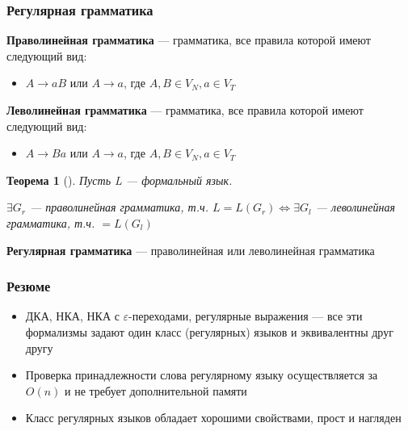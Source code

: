\documentclass{beamer}
\newtheorem{rutheorem}{Теорема}
\begin{document}
\begin{frame}[fragile]
  \transwipe[direction=90]
  \frametitle{Регулярная грамматика}
  \textbf{Праволинейная грамматика} --- грамматика, все правила которой имеют следующий вид:
  \begin{itemize}
    \item $A \rightarrow a B$ или $A \rightarrow a$, где $A, B \in V_N, a \in V_T$
  \end{itemize}


  \textbf{Леволинейная грамматика} --- грамматика, все правила которой имеют следующий вид:
  \begin{itemize}
    \item $A \rightarrow B a$ или $A \rightarrow a$, где $A, B \in V_N, a \in V_T$
  \end{itemize}

\pause 

  \begin{rutheorem}[]
    Пусть L --- формальный язык. 

    $\exists G_r$ --- праволинейная грамматика, т.ч. $L = L(G_r) \Leftrightarrow \exists G_l$ --- леволинейная грамматика, т.ч. $ = L(G_l) $
  \end{rutheorem}
\pause
  \textbf{Регулярная грамматика} --- праволинейная или леволинейная грамматика
\end{frame}

\begin{frame}[fragile]
  \transwipe[direction=90]
  \frametitle{Резюме}
  \begin{itemize}
    \item ДКА, НКА, НКА с $\varepsilon$-переходами, регулярные выражения --- все эти формализмы задают один класс (регулярных) языков и эквивалентны друг другу
    \item Проверка принадлежности слова регулярному языку осуществляется за $O(n)$ и не требует дополнительной памяти
    \item Класс регулярных языков обладает хорошими свойствами, прост и нагляден
  \end{itemize}
  
\end{frame}
\end{document}
